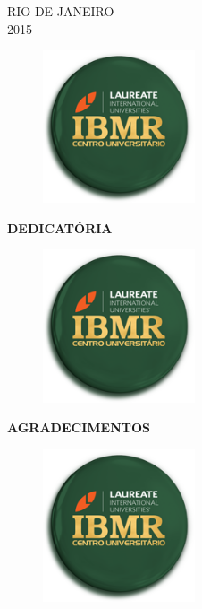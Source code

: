 \documentclass[12pt]{article} %
\begin{document}
\begin{center}
\MakeUppercase{Rio de Janeiro}\\
2015
\end{center}

\newpage

\begin{center}
\begin{figure}[h!]
\centering
\includegraphics[width=4.5cm]{ibmr.png}
\end{figure}
\MakeUppercase{\textbf{Dedicatória}}
\end{center}


\newpage

\begin{center}
\begin{figure}[h!]
\centering
\includegraphics[width=4.5cm]{ibmr.png}
\end{figure}
\MakeUppercase{\textbf{Agradecimentos}}
\end{center}


\newpage
\begin{figure}[h!]
\centering
\includegraphics[width=4.5cm]{ibmr.png}
\end{figure}
\end{document}
